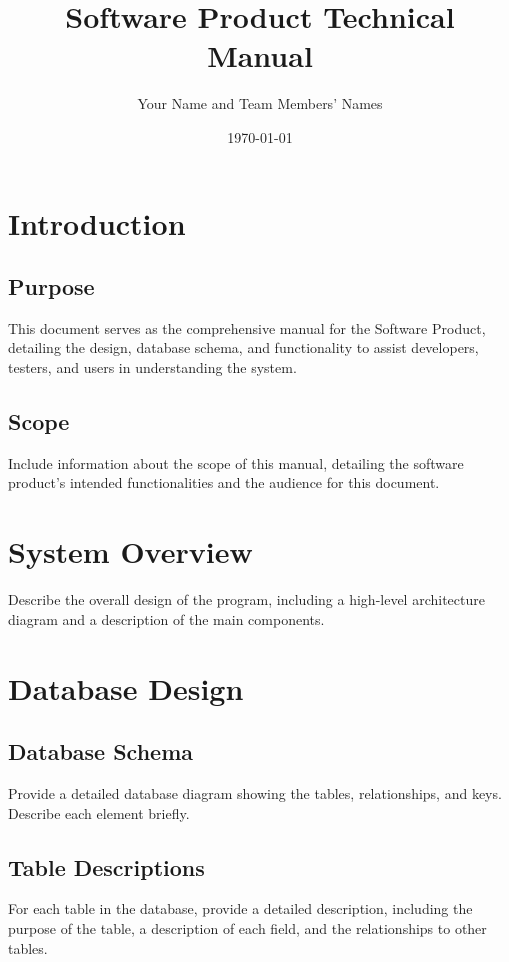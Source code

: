 \documentclass[12pt]{article}
\title{Software Product Technical Manual}
\author{Your Name and Team Members' Names}
\date{\today}
\begin{document}
\maketitle
\tableofcontents
\newpage

\section{Introduction}
\subsection{Purpose}
This document serves as the comprehensive manual for the Software Product, detailing the design, database schema, and functionality to assist developers, testers, and users in understanding the system.

\subsection{Scope}
Include information about the scope of this manual, detailing the software product's intended functionalities and the audience for this document.

\section{System Overview}
Describe the overall design of the program, including a high-level architecture diagram and a description of the main components.

\section{Database Design}
\subsection{Database Schema}
Provide a detailed database diagram showing the tables, relationships, and keys. Describe each element briefly.

\subsection{Table Descriptions}
For each table in the database, provide a detailed description, including the purpose of the table, a description of each field, and the relationships to other tables.
\end{document}
